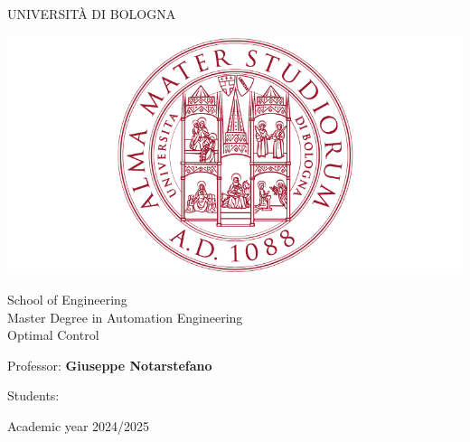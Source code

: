 \documentclass[a4paper,11pt,oneside]{book}
\begin{document}
\pagestyle{myheadings}

\thispagestyle{empty}                                                 
\begin{center}                                                            
    \vspace{5mm}
    {\LARGE UNIVERSIT\`A DI BOLOGNA} \\                       
      \vspace{5mm}
\end{center}
\begin{center}
  \includegraphics[scale=.27]{figs/logo_unibo}
\end{center}
\begin{center}
      \vspace{5mm}
      {\LARGE School of Engineering} \\
        \vspace{3mm}
      {\Large Master Degree in Automation Engineering} \\
      \vspace{20mm}
      {\LARGE Optimal Control} \\
      \vspace{15mm}
\end{center}
\begin{flushleft}                                                                              
     {\large Professor: \textbf{\@ Giuseppe Notarstefano}} \\        
      \vspace{13mm}
\end{flushleft}
\begin{flushright}
      {\large Students:}\\
\end{flushright}        %
\begin{center}
\vfill
      {\large Academic year \@2024/2025} \\
\end{center}
\end{document}
